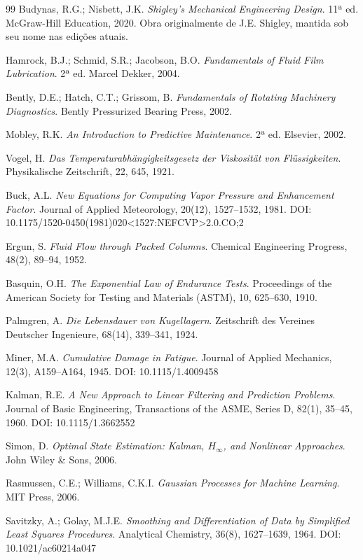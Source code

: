\documentclass[12pt,a4paper]{article}
\numberwithin{equation}{section}
\numberwithin{table}{section}
\numberwithin{figure}{section}
\begin{document}
{\begin{thebibliography}{99}
 Budynas, R.G.; Nisbett, J.K. \textit{Shigley's Mechanical Engineering Design}. 11ª ed. McGraw-Hill Education, 2020. Obra originalmente de J.E. Shigley, mantida sob seu nome nas edições atuais.

 Hamrock, B.J.; Schmid, S.R.; Jacobson, B.O. \textit{Fundamentals of Fluid Film Lubrication}. 2ª ed. Marcel Dekker, 2004.

 Bently, D.E.; Hatch, C.T.; Grissom, B. \textit{Fundamentals of Rotating Machinery Diagnostics}. Bently Pressurized Bearing Press, 2002.

 Mobley, R.K. \textit{An Introduction to Predictive Maintenance}. 2ª ed. Elsevier, 2002.

 Vogel, H. \textit{Das Temperaturabhängigkeitsgesetz der Viskosität von Flüssigkeiten}. Physikalische Zeitschrift, 22, 645, 1921.

 Buck, A.L. \textit{New Equations for Computing Vapor Pressure and Enhancement Factor}. Journal of Applied Meteorology, 20(12), 1527–1532, 1981. DOI: 10.1175/1520-0450(1981)020\textless 1527:NEFCVP\textgreater 2.0.CO;2

 Ergun, S. \textit{Fluid Flow through Packed Columns}. Chemical Engineering Progress, 48(2), 89–94, 1952.

 Basquin, O.H. \textit{The Exponential Law of Endurance Tests}. Proceedings of the American Society for Testing and Materials (ASTM), 10, 625–630, 1910.

 Palmgren, A. \textit{Die Lebensdauer von Kugellagern}. Zeitschrift des Vereines Deutscher Ingenieure, 68(14), 339–341, 1924.

 Miner, M.A. \textit{Cumulative Damage in Fatigue}. Journal of Applied Mechanics, 12(3), A159–A164, 1945. DOI: 10.1115/1.4009458

 Kalman, R.E. \textit{A New Approach to Linear Filtering and Prediction Problems}. Journal of Basic Engineering, Transactions of the ASME, Series D, 82(1), 35–45, 1960. DOI: 10.1115/1.3662552

 Simon, D. \textit{Optimal State Estimation: Kalman, $H_\infty$, and Nonlinear Approaches}. John Wiley \& Sons, 2006.

 Rasmussen, C.E.; Williams, C.K.I. \textit{Gaussian Processes for Machine Learning}. MIT Press, 2006.

 Savitzky, A.; Golay, M.J.E. \textit{Smoothing and Differentiation of Data by Simplified Least Squares Procedures}. Analytical Chemistry, 36(8), 1627–1639, 1964. DOI: 10.1021/ac60214a047


\end{thebibliography}}
\end{document}

